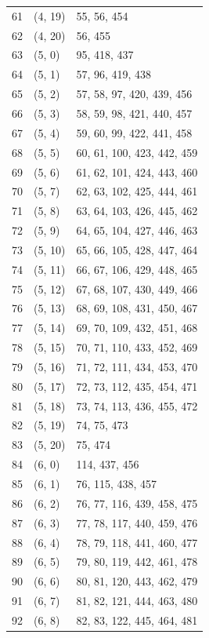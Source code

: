 \documentclass{article}
\begin{document}
\begin{longtable}{lll}
  61 & (4, 19) & 55, 56, 454 \\
  62 & (4, 20) & 56, 455 \\
  63 & (5, 0) & 95, 418, 437 \\
  64 & (5, 1) & 57, 96, 419, 438 \\
  65 & (5, 2) & 57, 58, 97, 420, 439, 456 \\
  66 & (5, 3) & 58, 59, 98, 421, 440, 457 \\
  67 & (5, 4) & 59, 60, 99, 422, 441, 458 \\
  68 & (5, 5) & 60, 61, 100, 423, 442, 459 \\
  69 & (5, 6) & 61, 62, 101, 424, 443, 460 \\
  70 & (5, 7) & 62, 63, 102, 425, 444, 461 \\
  71 & (5, 8) & 63, 64, 103, 426, 445, 462 \\
  72 & (5, 9) & 64, 65, 104, 427, 446, 463 \\
  73 & (5, 10) & 65, 66, 105, 428, 447, 464 \\
  74 & (5, 11) & 66, 67, 106, 429, 448, 465 \\
  75 & (5, 12) & 67, 68, 107, 430, 449, 466 \\
  76 & (5, 13) & 68, 69, 108, 431, 450, 467 \\
  77 & (5, 14) & 69, 70, 109, 432, 451, 468 \\
  78 & (5, 15) & 70, 71, 110, 433, 452, 469 \\
  79 & (5, 16) & 71, 72, 111, 434, 453, 470 \\
  80 & (5, 17) & 72, 73, 112, 435, 454, 471 \\
  81 & (5, 18) & 73, 74, 113, 436, 455, 472 \\
  82 & (5, 19) & 74, 75, 473 \\
  83 & (5, 20) & 75, 474 \\
  84 & (6, 0) & 114, 437, 456 \\
  85 & (6, 1) & 76, 115, 438, 457 \\
  86 & (6, 2) & 76, 77, 116, 439, 458, 475 \\
  87 & (6, 3) & 77, 78, 117, 440, 459, 476 \\
  88 & (6, 4) & 78, 79, 118, 441, 460, 477 \\
  89 & (6, 5) & 79, 80, 119, 442, 461, 478 \\
  90 & (6, 6) & 80, 81, 120, 443, 462, 479 \\
  91 & (6, 7) & 81, 82, 121, 444, 463, 480 \\
  92 & (6, 8) & 82, 83, 122, 445, 464, 481 \\

\end{longtable}
\end{document}
